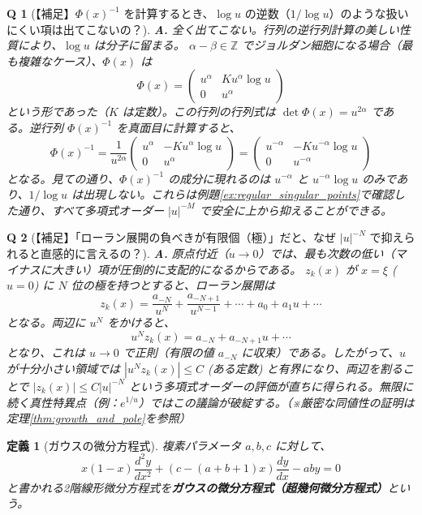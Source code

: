 \documentclass[paper=a4, fontsize=11pt]{jlreq} %
\theoremstyle{break}
\newtheorem{definition}[theorem]{定義}
\theoremstyle{qa}
\newtheorem*{Q}{Q}
\theoremstyle{remark} %
\begin{document}
\begin{Q}[【補足】$\Phi(x)^{-1}$ を計算するとき、$\log u$ の逆数（$1/\log u$）のような扱いにくい項は出てこないの？]
\textbf{A.} 全く出てこない。行列の逆行列計算の美しい性質により、$\log u$ は分子に留まる。
$\alpha - \beta \in \mathbb{Z}$ でジョルダン細胞になる場合（最も複雑なケース）、$\Phi(x)$ は
\[
\Phi(x) = 
\begin{pmatrix}
    u^\alpha & K u^\alpha \log u \\
    0 & u^\alpha
\end{pmatrix}
\]
という形であった（$K$ は定数）。この行列の行列式は $\det \Phi(x) = u^{2\alpha}$ である。逆行列 $\Phi(x)^{-1}$ を真面目に計算すると、
\[
\Phi(x)^{-1} = \frac{1}{u^{2\alpha}}
\begin{pmatrix}
    u^\alpha & -K u^\alpha \log u \\
    0 & u^\alpha
\end{pmatrix}
=
\begin{pmatrix}
    u^{-\alpha} & -K u^{-\alpha} \log u \\
    0 & u^{-\alpha}
\end{pmatrix}
\]
となる。見ての通り、$\Phi(x)^{-1}$ の成分に現れるのは $u^{-\alpha}$ と $u^{-\alpha} \log u$ のみであり、$1/\log u$ は出現しない。これらは例題\ref{ex:regular_singular_points}で確認した通り、すべて多項式オーダー $|u|^{-M}$ で安全に上から抑えることができる。
\end{Q}

\begin{Q}[【補足】「ローラン展開の負べきが有限個（極）」だと、なぜ $|u|^{-N}$ で抑えられると直感的に言えるの？]
\textbf{A.} 原点付近（$u \to 0$）では、最も次数の低い（マイナスに大きい）項が圧倒的に支配的になるからである。
$z_k(x)$ が $x=\xi$ ($u=0$) に $N$ 位の極を持つとすると、ローラン展開は
\[
z_k(x) = \frac{a_{-N}}{u^N} + \frac{a_{-N+1}}{u^{N-1}} + \cdots + a_0 + a_1 u + \cdots
\]
となる。両辺に $u^N$ をかけると、
\[
u^N z_k(x) = a_{-N} + a_{-N+1}u + \cdots 
\]
となり、これは $u \to 0$ で正則（有限の値 $a_{-N}$ に収束）である。したがって、$u$ が十分小さい領域では $|u^N z_k(x)| \le C$ (ある定数) と有界になり、両辺を割ることで $|z_k(x)| \le C|u|^{-N}$ という多項式オーダーの評価が直ちに得られる。無限に続く真性特異点（例：$e^{1/u}$）ではこの議論が破綻する。（※厳密な同値性の証明は定理\ref{thm:growth_and_pole}を参照）
\end{Q}

\begin{definition}[ガウスの微分方程式]
    複素パラメータ $a, b, c$ に対して、
    \begin{equation}\label{eq:gauss_hypergeometric}
    x(1-x)\frac{d^{2}y}{dx^{2}}+(c-(a+b+1)x)\frac{dy}{dx}-aby = 0
    \end{equation}
    と書かれる2階線形微分方程式を\textbf{ガウスの微分方程式（超幾何微分方程式）}という。
\end{definition}
\end{document}
